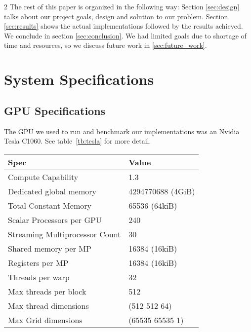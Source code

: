 \documentclass[10pt]{article}
\begin{document}
\begin{multicols}{2}
  The rest of this paper is organized in the following way:
  Section \ref{sec:design} talks about our project goals, design and solution to our problem.
  Section \ref{sec:results} shows the actual implementations followed by the results achieved.
  We conclude in section \ref{sec:conclusion}.
  We had limited goals due to shortage of time and resources, so we discuss future work in \ref{sec:future_work}.

  \section{System Specifications}
  \subsection{GPU Specifications}
  The GPU we used to run and benchmark our implementations was an Nvidia Tesla C1060.
  See table~\ref{tb:tesla} for more detail.

  \begin{table*}[!ht]\centering
    \begin{tabular}{@{}l l@{}}\toprule
      \bf{Spec}                       &   \bf{Value}          \\
      \hline
      Compute Capability              &   1.3                 \\
      Dedicated global memory         &   4294770688 (4GiB)   \\
      Total Constant Memory           &   65536 (64kiB)       \\
      Scalar Processors per GPU       &   240                 \\
      Streaming Multiprocessor Count  &   30                  \\
      Shared memory per MP            &   16384 (16kiB)       \\
      Registers per MP                &   16384 (16kiB)       \\
      Threads per warp                &   32                  \\
      Max threads per block           &   512                 \\
      Max thread dimensions           &   (512 512 64)        \\
      Max Grid dimensions             &   (65535 65535 1)     \\
      \hline
    \end{tabular}
    \caption{Nvidia Tesla C1060 Specifications}
    \label{tb:tesla}
  \end{table*}


\end{multicols}
\end{document}
